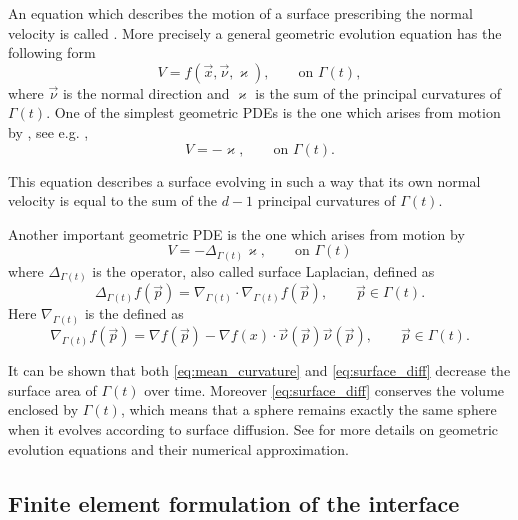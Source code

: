 An equation which describes the motion of a surface prescribing the normal
velocity is called . More precisely a general geometric
evolution equation has the following form
\begin{equation}\label{eq:geometric_pde}
 V=f(\vec{x},\vec{\nu},\varkappa),\qquad\mbox{on }\Gamma(t),
\end{equation}
where $\vec{\nu}$ is the normal direction and $\varkappa$ is the sum of the
principal curvatures of $\Gamma(t)$. One of the simplest geometric PDEs is the
one which arises from motion by , see e.g.
\cite{DeckelnickDE05},
\begin{equation}\label{eq:mean_curvature}
 V=-\varkappa,\qquad\mbox{on }\Gamma(t).
\end{equation}

This equation describes a surface evolving in such a way that its own normal
velocity is equal to the sum of the $d-1$ principal curvatures of $\Gamma(t)$.
\newline

Another important geometric PDE is the one which arises from motion by
\begin{equation}\label{eq:surface_diff}
 V=-\Delta_{\Gamma(t)} \varkappa,\qquad\mbox{on }\Gamma(t)
\end{equation}
where $\Delta_{\Gamma(t)}$ is the  operator, also called
surface Laplacian, defined as
\begin{equation}\label{eq:laplace_beltrami}
 \Delta_{\Gamma(t)}f(\vec{p}) =
 \nabla_{\Gamma(t)}\cdot\nabla_{\Gamma(t)}f(\vec{p} ) ,\qquad
 \vec{p}\in\Gamma(t).
\end{equation}
Here $\nabla_{\Gamma(t)}$ is the  defined as
\begin{equation}\label{eq:tangent_gradient}
 \nabla_{\Gamma(t)}f(\vec{p})=\nabla f(\vec{p})-\nabla
 f(x)\cdot\vec{\nu}(\vec{p})\vec{\nu}(\vec{p}),\qquad \vec{p}\in\Gamma(t).
\end{equation}

It can be shown that both \eqref{eq:mean_curvature} and
\eqref{eq:surface_diff} decrease the surface area of $\Gamma(t)$ over time.
Moreover \eqref{eq:surface_diff} conserves the volume enclosed by $\Gamma(t)$,
which means that a sphere remains exactly the same sphere when it evolves
according to surface diffusion. See \cite{DeckelnickDE05} for more details on
geometric evolution equations and their numerical approximation.

\subsection{Finite element formulation of the interface}

